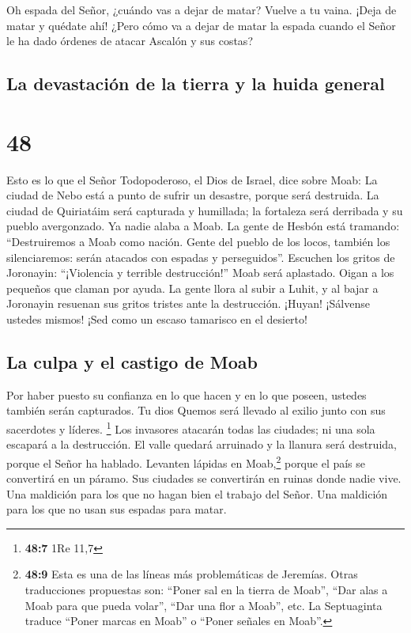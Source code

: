  Oh espada del Señor, ¿cuándo vas a dejar de matar? Vuelve
a tu vaina. ¡Deja de matar y quédate ahí!  ¿Pero cómo va a
dejar de matar la espada cuando el Señor le ha dado órdenes de atacar
Ascalón y sus costas?

\hypertarget{la-devastaciuxf3n-de-la-tierra-y-la-huida-general}{%
\subsection{La devastación de la tierra y la huida
general}\label{la-devastaciuxf3n-de-la-tierra-y-la-huida-general}}

\hypertarget{section-47}{%
\section{48}\label{section-47}}

 Esto es lo que el Señor Todopoderoso, el Dios de Israel,
dice sobre Moab: La ciudad de Nebo está a punto de sufrir un desastre,
porque será destruida. La ciudad de Quiriatáim será capturada y
humillada; la fortaleza será derribada y su pueblo avergonzado.
 Ya nadie alaba a Moab. La gente de Hesbón está tramando:
``Destruiremos a Moab como nación. Gente del pueblo de los locos,
también los silenciaremos: serán atacados con espadas y perseguidos''.
 Escuchen los gritos de Joronayin: ``¡Violencia y terrible
destrucción!''  Moab será aplastado. Oigan a los pequeños
que claman por ayuda.  La gente llora al subir a Luhit, y
al bajar a Joronayin resuenan sus gritos tristes ante la destrucción.
 ¡Huyan! ¡Sálvense ustedes mismos! ¡Sed como un escaso
tamarisco en el desierto!

\hypertarget{la-culpa-y-el-castigo-de-moab}{%
\subsection{La culpa y el castigo de
Moab}\label{la-culpa-y-el-castigo-de-moab}}

 Por haber puesto su confianza en lo que hacen y en lo que
poseen, ustedes también serán capturados. Tu dios Quemos será llevado al
exilio junto con sus sacerdotes y líderes. \footnote{\textbf{48:7} 1Re
  11,7}  Los invasores atacarán todas las ciudades; ni una
sola escapará a la destrucción. El valle quedará arruinado y la llanura
será destruida, porque el Señor ha hablado.  Levanten
lápidas en Moab,\footnote{\textbf{48:9} Esta es una de las líneas más
  problemáticas de Jeremías. Otras traducciones propuestas son: ``Poner
  sal en la tierra de Moab'', ``Dar alas a Moab para que pueda volar'',
  ``Dar una flor a Moab'', etc. La Septuaginta traduce ``Poner marcas en
  Moab'' o ``Poner señales en Moab''.} porque el país se convertirá en
un páramo. Sus ciudades se convertirán en ruinas donde nadie vive.
 Una maldición para los que no hagan bien el trabajo del
Señor. Una maldición para los que no usan sus espadas para matar.

